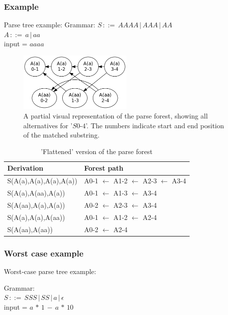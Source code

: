 \documentclass[a4paper,10pt]{article}
\begin{document}
\subsubsection{Example}

Parse tree example:
Grammar:
$S\,::=\,AAAA\,|\,AAA\,|\,AA$\\
$A\,::=\,a\,|\,aa$\\
input = $aaaa$

\begin{figure}[H]
\centering
\includegraphics[width=0.5\textwidth]{a_aa-forest.png}
\caption{A partial visual representation of the parse forest, showing all alternatives for '$S0$-$4$'. The numbers indicate start and end position of the matched substring.}
\end{figure}

\begin{table}[H]
\centering
\begin{tabular}{ p{15em} p{15em} }
Derivation & Forest path\\
\hline
S(A(a),A(a),A(a),A(a)) & A0-1 $\leftarrow$ A1-2 $\leftarrow$ A2-3 $\leftarrow$ A3-4\\
S(A(a),A(aa),A(a)) & A0-1 $\leftarrow$ A1-3 $\leftarrow$ A3-4\\
S(A(aa),A(a),A(a)) & A0-2 $\leftarrow$ A2-3 $\leftarrow$ A3-4\\
S(A(a),A(a),A(aa)) & A0-1 $\leftarrow$ A1-2 $\leftarrow$ A2-4\\
S(A(aa),A(aa)) & A0-2 $\leftarrow$ A2-4
\end{tabular}
\caption{'Flattened' version of the parse forest}
\end{table}

\subsubsection{Worst case example}

Worst-case parse tree example:

Grammar:\\
$S\,::=\,SSS\,|\,SS\,|\,a\,|\,\epsilon$\\
input = $a\,*\,1\,-\,a\,*\,10$
\end{document}
